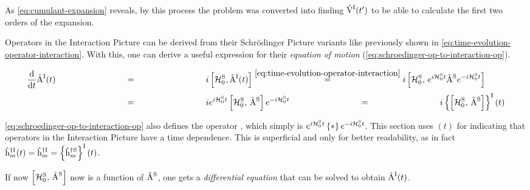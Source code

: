As \autoref{eq:cumulant-expansion} reveals, by this process the problem was converted into finding $\VhamiltonianOf[\interactionPicture]{t'}$ to be able to calculate the first two orders of the expansion.

Operators in the Interaction Picture can be derived from their Schrödinger Picture variants like previously shown in \autoref{eq:time-evolution-operator-interaction}. 
With this, one can derive a useful expression for their \emph{equation of motion} (\autoref{eq:schroedinger-op-to-interaction-op}).

\begin{equation}
    \label{eq:schroedinger-op-to-interaction-op}
    \begin{split}
        \difft{}\AopOfT[\interactionPicture] &\stackrel{\phantom{\ref{eq:time-evolution-operator-interaction}}}{=} i \left[\HzeroHamiltonian[\schroedingerPicture], \AopOfT[\interactionPicture]\right]
        \stackrel{\ref{eq:time-evolution-operator-interaction}}{=}
        i \left[\HzeroHamiltonian[\schroedingerPicture],\,e^{i \HzeroHamiltonian[\schroedingerPicture]{} t} \Aop[\schroedingerPicture] e^{-i \HzeroHamiltonian[\schroedingerPicture]{} t}\right]\\
        &\stackrel{\phantom{\ref{eq:time-evolution-operator-interaction}}}{=}
        i e^{i \HzeroHamiltonian[\schroedingerPicture]{} t}\left[\HzeroHamiltonian[\schroedingerPicture],\, \Aop[\schroedingerPicture]\right]e^{-i \HzeroHamiltonian[\schroedingerPicture]{} t}
        \stackrel{\phantom{\ref{eq:time-evolution-operator-interaction}}}{=}
        i \interactionTimeEvolution{\left[\HzeroHamiltonian[\schroedingerPicture],\, \Aop[\schroedingerPicture]\right]}
    \end{split}
\end{equation}

\autoref{eq:schroedinger-op-to-interaction-op} also defines the operator \interactionTimeEvolution{\ast}, which simply is $e^{i \HzeroHamiltonian[\schroedingerPicture]{} t} \left\{\ast \right\} e^{-i \HzeroHamiltonian[\schroedingerPicture]{} t}$.
This section uses $(t)$ for indicating that operators in the Interaction Picture have a time dependence. 
This is superficial and only for better readability, as in fact $\hopOfT[\interactionPicture]{m}{\dagger} = \hop[\interactionPicture]{m}{\dagger} = \interactionTimeEvolution{\hop[\schroedingerPicture]{m}{\dagger}}$.

If now $\left[\HzeroHamiltonian[\schroedingerPicture],\, \Aop[\schroedingerPicture]\right]$ now is a function of $\Aop[\schroedingerPicture]$, one gets a \emph{differential equation} that can be solved to obtain $\AopOfT[\interactionPicture]$.

